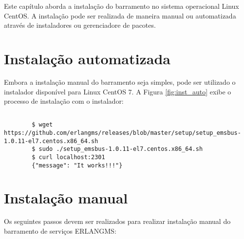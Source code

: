 Este capítulo aborda a instalação do barramento no sistema operacional Linux CentOS. 
A instalação pode ser realizada de maneira manual ou automatizada
através de instaladores ou gerenciadore de pacotes.

\section{Instalação automatizada}

Embora a instalação manual do barramento seja simples, pode ser utilizado o instalador 
disponível para Linux CentOS 7. A Figura \ref{fig:inst_auto} exibe 
o processo de instalação com o instalador:


	\renewcommand{\lstlistingname}{Código}             
	\begin{lstlisting}[Adding Erlang repository entry, label=fig:inst_auto] 

		$ wget https://github.com/erlangms/releases/blob/master/setup/setup_emsbus-1.0.11-el7.centos.x86_64.sh
		$ sudo ./setup_emsbus-1.0.11-el7.centos.x86_64.sh
		$ curl localhost:2301
		{"message": "It works!!!"}
	\end{lstlisting}



\section{Instalação manual}

Os seguintes passos devem ser realizados para realizar instalação manual do 
barramento de serviços ERLANGMS:


